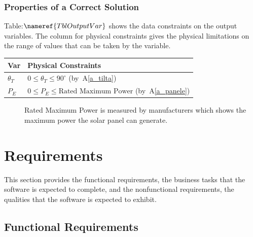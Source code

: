 \documentclass[12pt]{article}
\newcommand{\aref}[1]{A\ref{#1}}
\begin{document}
\subsubsection{Properties of a Correct Solution} \label{sec_CorrectSolution}

\noindent
Table:$\nameref{TblOutputVar}$ shows the data constraints on the output
variables. The column
for physical constraints gives the physical limitations on the range of values
that can be
taken by the variable.

\begin{table}[!h]
\caption{Output Variables} \label{TblOutputVar}
\renewcommand{\arraystretch}{1.2}
\noindent \begin{longtable*}{l l} 
  \toprule
  \textbf{Var} & \textbf{Physical Constraints} \\
  \midrule 
  $\theta_{T}$ & $0 \leq \theta_{T} \leq 90^\circ$ (by~\aref{a_tilta})\\
  $P_E$ & $0 \leq P_E \leq \text{Rated Maximum Power}$ (by~\aref{a_panele})
  \\
  \bottomrule
\end{longtable*}
\end{table}

\begin{description}

\item[ ] Rated Maximum Power is measured by manufacturers which shows the 
maximum power the solar panel can generate.

\end{description}

\section{Requirements}


This section provides the functional requirements, the business tasks that the
software is expected to complete, and the nonfunctional requirements, the
qualities that the software is expected to exhibit.



\subsection{Functional Requirements}
\end{document}
